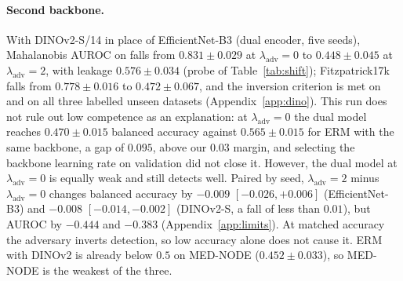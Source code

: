 \documentclass{midl}
\newcommand{\lam}{\lambda_{\mathrm{adv}}}
\begin{document}
\paragraph{Second backbone.} With DINOv2-S/14 in place of EfficientNet-B3 (dual encoder, five
seeds), Mahalanobis AUROC on \texttt{} falls from $0.831\pm0.029$ at $\lam=0$ to
$0.448\pm0.045$ at $\lam=2$, with leakage $0.576\pm0.034$ (probe of Table~\ref{tab:shift}); Fitzpatrick17k falls from $0.778\pm0.016$
to $0.472\pm0.067$, and the inversion criterion is met on \texttt{} and on all three
labelled unseen datasets (Appendix~\ref{app:dino}). This run does not rule out low competence as an
explanation: at $\lam=0$ the dual model reaches $0.470\pm0.015$ balanced accuracy against $0.565\pm0.015$
for ERM with the same backbone, a gap of $0.095$, above our $0.03$ margin, and selecting the backbone
learning rate on validation did not close it. However, the dual model at $\lam=0$ is equally weak
and still detects well. Paired by seed, $\lam=2$ minus $\lam=0$ changes balanced accuracy by
$-0.009$ $[-0.026, +0.006]$ (EfficientNet-B3) and $-0.008$ $[-0.014, -0.002]$ (DINOv2-S, a fall of less
than $0.01$), but \texttt{} AUROC by $-0.444$ and $-0.383$ (Appendix~\ref{app:limits}).
At matched accuracy the adversary inverts detection, so low accuracy alone does not cause it. ERM with DINOv2 is
already below $0.5$ on MED-NODE ($0.452\pm0.033$), so MED-NODE is the weakest of the three.
\end{document}
